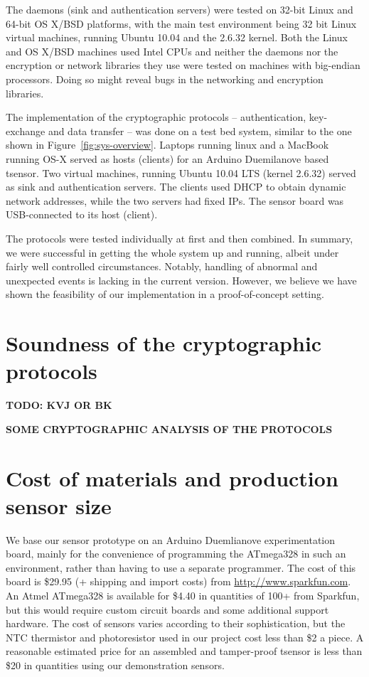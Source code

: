 The daemons (sink and authentication servers) were tested on 32-bit Linux and 64-bit OS X/BSD platforms, with the main test environment being 32 bit Linux virtual machines, running Ubuntu 10.04 and the 2.6.32 kernel. Both the Linux and OS X/BSD machines used Intel CPUs and neither the daemons nor the encryption or network libraries they use were tested on machines with big-endian processors. Doing so might reveal bugs in the networking and encryption libraries. 

The implementation of the cryptographic protocols -- authentication, key-exchange and data transfer -- was done on a test bed system, similar to the one shown in Figure~\ref{fig:sys-overview}. Laptops running linux and a MacBook running OS-X served as hosts (clients) for an Arduino Duemilanove based tsensor. Two virtual machines, running Ubuntu 10.04 LTS (kernel 2.6.32) served as sink and authentication servers. The clients used DHCP to obtain dynamic network addresses, while the two servers had fixed IPs. The sensor board was USB-connected to its host (client).

The protocols were tested individually at first and then combined. In summary, we were successful in getting the whole system up and running, albeit under fairly well controlled circumstances. Notably, handling of abnormal and unexpected events is lacking in the current version. However, we believe we have shown the feasibility of our implementation in a proof-of-concept setting.

\section{Soundness of the cryptographic protocols}
\label{sec:crypto-protocol-analysis}

\textbf{TODO: KVJ OR BK}

\textbf{SOME CRYPTOGRAPHIC ANALYSIS OF THE PROTOCOLS}

\section{Cost of materials and production sensor size}

We base our sensor prototype on an Arduino Duemlianove experimentation board, mainly for the convenience of programming the ATmega328 in such an environment, rather than having to use a separate programmer. The cost of this board is \$29.95 (+ shipping and import costs) from \url{http://www.sparkfun.com}. An Atmel ATmega328 is available for \$4.40 in quantities of 100+ from Sparkfun, but this would require custom circuit boards and some additional support hardware. The cost of sensors varies according to their sophistication, but the NTC thermistor and photoresistor used in our project cost less than \$2 a piece. A reasonable estimated price for an assembled and tamper-proof tsensor is less than \$20 in quantities using our demonstration sensors. 

